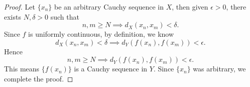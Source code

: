\begin{Exercise}
	\begin{proof}
		Let $\{x_n\}$ be an arbitrary Cauchy sequence in $X$, then given $\epsilon>0$, there exists $N,\delta>0$ such that
		$$
		n,m\geq N \implies d_X(x_n,x_m)<\delta.
		$$
		Since $f$ is uniformly continuous, by definition, we know
		$$
		d_X(x_n,x_m) <\delta \implies d_Y(f(x_n),f(x_m)) < \epsilon.
		$$
		Hence
		$$
		n,m\geq N \implies d_Y(f(x_n),f(x_m))<\epsilon.
		$$
		This means $\{f(x_n)\}$ is a Cauchy sequence in $Y$. Since $\{x_n\}$ was arbitrary, we complete the proof.
	\end{proof}
\end{Exercise}